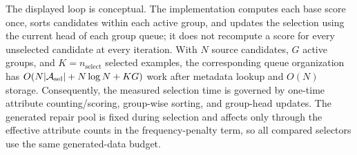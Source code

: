 The displayed loop is conceptual. The implementation computes each base score once, sorts candidates within each active group, and updates the selection using the current head of each group queue; it does not recompute a score for every unselected candidate at every iteration. With $N$ source candidates, $G$ active groups, and $K=n_{\mathrm{select}}$ selected examples, the corresponding queue organization has $O(N|\mathcal{A}_{\mathrm{sel}}|+N\log N+KG)$ work after metadata lookup and $O(N)$ storage. Consequently, the measured selection time is governed by one-time attribute counting/scoring, group-wise sorting, and group-head updates. The generated repair pool is fixed during selection and affects \model only through the effective attribute counts in the frequency-penalty term, so all compared selectors use the same generated-data budget.
